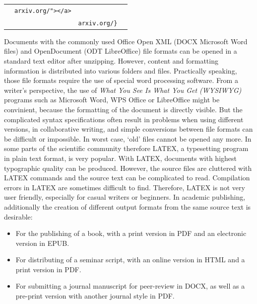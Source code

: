 \documentclass[10pt,fleqn]{wlpeerj}
\providecommand{\tightlist}{%
  \setlength{\itemsep}{0pt}\setlength{\parskip}{0pt}}
\begin{document}
\begin{longtable}[]{@{}llll@{}}
\begin{minipage}[t]{0.25\columnwidth}
\strut\end{minipage}
&
\begin{minipage}[t]{0.27\columnwidth}\raggedright\strut
\texttt{arxiv.org/"\textgreater{}\textless{}/a\textgreater{}}
\strut\end{minipage}\tabularnewline
\begin{minipage}[t]{0.20\columnwidth}\raggedright\strut
\strut\end{minipage}
&
\begin{minipage}[t]{0.17\columnwidth}\raggedright\strut
\strut\end{minipage}
&
\begin{minipage}[t]{0.25\columnwidth}\raggedright\strut
\texttt{arxiv.org/\}}
\strut\end{minipage}
&
\begin{minipage}[t]{0.27\columnwidth}\raggedright\strut
\strut\end{minipage}\tabularnewline
\bottomrule
\end{longtable}

Documents
with
the
commonly
used
Office
Open
XML
(DOCX
Microsoft
Word
files)
and
OpenDocument
(ODT
LibreOffice)
file
formats
can
be
opened
in a
standard
text
editor
after
unzipping.
However,
content
and
formatting
information
is
distributed
into
various
folders
and
files.
Practically
speaking,
those
file
formats
require
the
use
of
special
word
processing
software.
From
a
writer's
perspective,
the
use
of
\emph{What
You
See
Is
What
You
Get
(WYSIWYG)}
programs
such
as
Microsoft
Word,
WPS
Office
or
LibreOffice
might
be
convinient,
because
the
formatting
of
the
document
is
directly
visible.
But
the
complicated
syntax
specifications
often
result
in
problems
when
using
different
versions,
in
collaborative
writing,
and
simple
conversions
between
file
formats
can
be
difficult
or
impossible.
In
worst
case,
`old'
files
cannot
be
opened
any
more.
In
some
parts
of
the
scientific
community
therefore
LATEX,
a
typesetting
program
in
plain
text
format,
is
very
popular.
With
LATEX,
documents
with
highest
typographic
quality
can
be
produced.
However,
the
source
files
are
cluttered
with
LATEX
commands
and
the
source
text
can
be
complicated
to
read.
Compilation
errors
in
LATEX
are
sometimes
difficult
to
find.
Therefore,
LATEX
is
not
very
user
friendly,
especially
for
casual
writers
or
beginners.
In
academic
publishing,
additionally
the
creation
of
different
output
formats
from
the
same
source
text
is
desirable:

\begin{itemize}
\tightlist
\item
  For
  the
  publishing
  of
  a
  book,
  with
  a
  print
  version
  in
  PDF
  and
  an
  electronic
  version
  in
  EPUB.
\item
  For
  distributing
  of
  a
  seminar
  script,
  with
  an
  online
  version
  in
  HTML
  and
  a
  print
  version
  in
  PDF.
\item
  For
  submitting
  a
  journal
  manuscript
  for
  peer-review
  in
  DOCX,
  as
  well
  as
  a
  pre-print
  version
  with
  another
  journal
  style
  in
  PDF.
\end{itemize}
\end{document}
